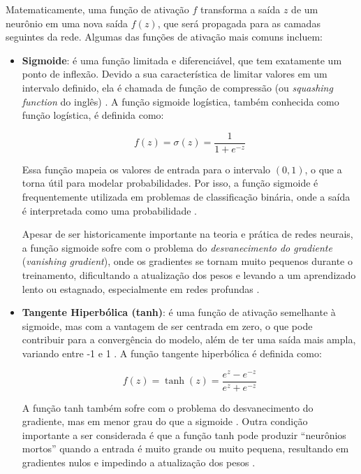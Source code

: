 Matematicamente, uma função de ativação $f$ transforma a saída $z$ de um neurônio em uma nova saída $f(z)$, que será propagada para as camadas seguintes da rede. Algumas das funções de ativação mais comuns incluem:

\begin{itemize}
    \item \textbf{Sigmoide}: é uma função limitada e diferenciável, que tem exatamente um ponto de inflexão. Devido a sua característica de limitar valores em um intervalo definido, ela é chamada de função de compressão (ou \textit{squashing function} do inglês) \citep{lederer2021activation}. A função sigmoide logística, também conhecida como função logística, é definida como:
    
    \[
    f(z) = \sigma(z) = \frac{1}{1 + e^{-z}}
    \]
    
    Essa função mapeia os valores de entrada para o intervalo $(0, 1)$, o que a torna útil para modelar probabilidades. Por isso, a função sigmoide é frequentemente utilizada em problemas de classificação binária, onde a saída é interpretada como uma probabilidade \citep{nwankpa2018activation}.

    Apesar de ser historicamente importante na teoria e prática de redes neurais, a função sigmoide sofre com o problema do \textit{desvanecimento do gradiente} (\textit{vanishing gradient}), onde os gradientes se tornam muito pequenos durante o treinamento, dificultando a atualização dos pesos e levando a um aprendizado lento ou estagnado, especialmente em redes profundas \citep{Dubey2022}.

    \item \textbf{Tangente Hiperbólica (tanh)}: é uma função de ativação semelhante à sigmoide, mas com a vantagem de ser centrada em zero, o que pode contribuir para a convergência do modelo, além de ter uma saída mais ampla, variando entre -1 e 1 \citep{nwankpa2018activation}. A função tangente hiperbólica é definida como:
    
    \[
    f(z) = \tanh(z) = \frac{e^{z} - e^{-z}}{e^{z} + e^{-z}}
    \]
    
    A função tanh também sofre com o problema do desvanecimento do gradiente, mas em menor grau do que a sigmoide \citep{Dubey2022}. Outra condição importante a ser considerada é que a função tanh pode produzir ``neurônios mortos'' quando a entrada é muito grande ou muito pequena, resultando em gradientes nulos e impedindo a atualização dos pesos \citep{nwankpa2018activation}.


\end{itemize}
